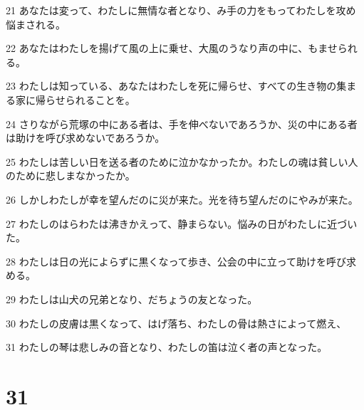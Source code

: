 \par 21 あなたは変って、わたしに無情な者となり、み手の力をもってわたしを攻め悩まされる。
\par 22 あなたはわたしを揚げて風の上に乗せ、大風のうなり声の中に、もませられる。
\par 23 わたしは知っている、あなたはわたしを死に帰らせ、すべての生き物の集まる家に帰らせられることを。
\par 24 さりながら荒塚の中にある者は、手を伸べないであろうか、災の中にある者は助けを呼び求めないであろうか。
\par 25 わたしは苦しい日を送る者のために泣かなかったか。わたしの魂は貧しい人のために悲しまなかったか。
\par 26 しかしわたしが幸を望んだのに災が来た。光を待ち望んだのにやみが来た。
\par 27 わたしのはらわたは沸きかえって、静まらない。悩みの日がわたしに近づいた。
\par 28 わたしは日の光によらずに黒くなって歩き、公会の中に立って助けを呼び求める。
\par 29 わたしは山犬の兄弟となり、だちょうの友となった。
\par 30 わたしの皮膚は黒くなって、はげ落ち、わたしの骨は熱さによって燃え、
\par 31 わたしの琴は悲しみの音となり、わたしの笛は泣く者の声となった。

\chapter{31}

